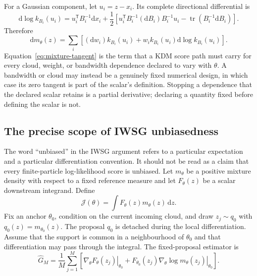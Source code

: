 \documentclass[11pt]{article}
\newcommand{\dd}{\mathrm{d}}
\begin{document}
For a Gaussian component, let $u_i=z-x_i$.  Its complete directional
differential is
\begin{equation}
 \dd\log k_{B_i}(u_i)
 =
 u_i^\mathsf{T}B_i^{-1}\dd x_i
 +\frac12\left[
   u_i^\mathsf{T}B_i^{-1}(\dd B_i)B_i^{-1}u_i
   -\operatorname{tr}(B_i^{-1}\dd B_i)
 \right].
 \label{eq:component-tangent}
\end{equation}
Therefore
\begin{equation}
 \dd m_\theta(z)
 =\sum_i\left[
       (\dd w_i)k_{B_i}(u_i)
       +w_i k_{B_i}(u_i)\dd\log k_{B_i}(u_i)
     \right]. \label{eq:mixture-tangent}
\end{equation}
Equation~\eqref{eq:mixture-tangent} is the term that a KDM score path must
carry for every cloud, weight, or bandwidth dependence declared to vary with
$\theta$.  A bandwidth or cloud may instead be a genuinely fixed numerical
design, in which case its zero tangent is part of the scalar's definition.
Stopping a dependence that the declared scalar retains is a partial
derivative; declaring a quantity fixed before defining the scalar is not.

\subsection{The precise scope of IWSG unbiasedness}
\label{sec:iwsg-scope}

The word ``unbiased'' in the IWSG argument refers to a particular expectation
and a particular differentiation convention. It should not be read as a
claim that every finite-particle log-likelihood score is unbiased. Let
$m_\theta$ be a positive mixture density with respect to a fixed reference
measure and let $F_\theta(z)$ be a scalar downstream integrand. Define
\begin{equation}
 \mathcal J(\theta)
   =\int F_\theta(z)m_\theta(z)\,\dd z.
 \label{eq:iwsg-target-expectation}
\end{equation}
Fix an anchor $\theta_0$, condition on the current incoming cloud, and draw
$z_j\sim q_0$ with $q_0(z)=m_{\theta_0}(z)$. The proposal $q_0$ is detached
during the local differentiation. Assume that the support is common in a
neighbourhood of $\theta_0$ and that differentiation may pass through the
integral. The fixed-proposal estimator is
\begin{equation}
 \widehat G_M
 =\frac1M\sum_{j=1}^M
   \left[
      \left.\nabla_\theta F_\theta(z_j)\right|_{\theta_0}
      +F_{\theta_0}(z_j)
       \left.\nabla_\theta\log m_\theta(z_j)\right|_{\theta_0}
   \right].
 \label{eq:iwsg-local-gradient}
\end{equation}
\end{document}
